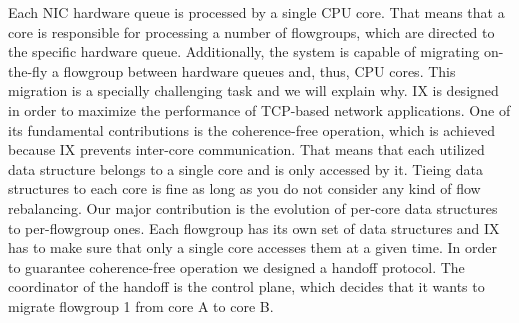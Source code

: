 Each NIC hardware queue is processed by a single CPU core.
That means that a core is responsible for processing a number of flowgroups, which are directed to the specific hardware queue.
Additionally, the system is capable of migrating on-the-fly a flowgroup between hardware queues and, thus, CPU cores.
This migration is a specially challenging task and we will explain why.
IX is designed in order to maximize the performance of TCP-based network applications.
One of its fundamental contributions is the coherence-free operation, which is achieved because IX prevents inter-core communication.
That means that each utilized data structure belongs to a single core and is only accessed by it.
Tieing data structures to each core is fine as long as you do not consider any kind of flow rebalancing.
Our major contribution is the evolution of per-core data structures to per-flowgroup ones.
Each flowgroup has its own set of data structures and IX has to make sure that only a single core accesses them at a given time.
In order to guarantee coherence-free operation we designed a handoff protocol.
The coordinator of the handoff is the control plane, which decides that it wants to migrate flowgroup 1 from core A to core B.

